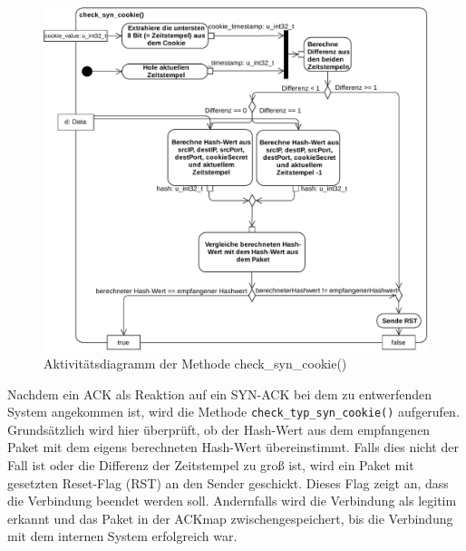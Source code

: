 \documentclass[../review_2.tex]{subfiles}
\begin{document}
\begin{figure}[t]
    \centering
    \includegraphics[width=\linewidth]{img/check_typ_syn_cookie_neu.pdf}
    \caption{Aktivitätsdiagramm der Methode check\_syn\_cookie()}
    \label{check_syn_cookie}
\end{figure}
    Nachdem ein ACK als Reaktion auf ein SYN-ACK bei dem zu entwerfenden System angekommen ist, wird die Methode \texttt{check\_typ\_syn\_cookie()} aufgerufen.
    Grundsätzlich wird hier überprüft, ob der Hash-Wert aus dem empfangenen Paket mit dem eigens berechneten Hash-Wert übereinstimmt. Falls dies nicht der Fall ist oder die Differenz der Zeitstempel zu groß ist, wird ein Paket mit gesetzten Reset-Flag (RST) an den Sender geschickt. Dieses Flag zeigt an, dass die Verbindung beendet werden soll. Andernfalls wird die Verbindung als legitim erkannt und das Paket in der ACKmap zwischengespeichert, bis die Verbindung mit dem internen System erfolgreich war. 
    
\end{document}
